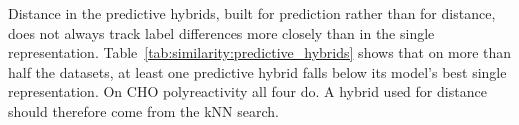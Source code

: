 

Distance in the predictive hybrids, built for prediction rather than for distance, does not always track label differences more closely than in the single representation. Table~\ref{tab:similarity:predictive_hybrids} shows that on more than half the datasets, at least one predictive hybrid falls below its model's best single representation. On CHO polyreactivity all four do. A hybrid used for distance should therefore come from the kNN search.

